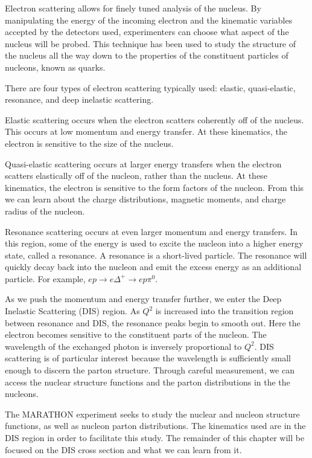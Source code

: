 Electron scattering allows for finely tuned analysis of the nucleus. By manipulating the energy of the incoming electron and the kinematic variables accepted by the detectors used, experimenters can choose what aspect of the nucleus will be probed. This technique has been used to study the structure of the nucleus all the way down to the properties of the constituent particles of nucleons, known as quarks.

There are four types of electron scattering typically used: elastic, quasi-elastic, resonance, and deep inelastic scattering.

Elastic scattering occurs when the electron scatters coherently off of the nucleus. This occurs at low momentum and energy transfer. At these kinematics, the electron is sensitive to the size of the nucleus.

Quasi-elastic scattering occurs at larger energy transfers when the electron scatters elastically off of the nucleon, rather than the nucleus. At these kinematics, the electron is sensitive to the form factors of the nucleon. From this we can learn about the charge distributions, magnetic moments, and charge radius of the nucleon.

Resonance scattering occurs at even larger momentum and energy transfers. In this region, some of the energy is used to excite the nucleon into a higher energy state, called a resonance. A resonance is a short-lived particle. The resonance will quickly decay back into the nucleon and emit the excess energy as an additional particle. For example, $ep \rightarrow e\Delta^+ \rightarrow ep\pi^0$.

As we push the momentum and energy transfer further, we enter the Deep Inelastic Scattering (DIS) region. As $Q^2$ is increased into the transition region between resonance and DIS, the resonance peaks begin to smooth out. Here the electron becomes sensitive to the constituent parts of the nucleon. The wavelength of the exchanged photon is inversely proportional to $Q^2$. DIS scattering is of particular interest because the wavelength is sufficiently small enough to discern the parton structure. Through careful measurement, we can access the nuclear structure functions and the parton distributions in the the nucleons.

The MARATHON experiment seeks to study the nuclear and nucleon structure functions, as well as nucleon parton distributions. The kinematics used are in the DIS region in order to facilitate this study. The remainder of this chapter will be focused on the DIS cross section and what we can learn from it.

